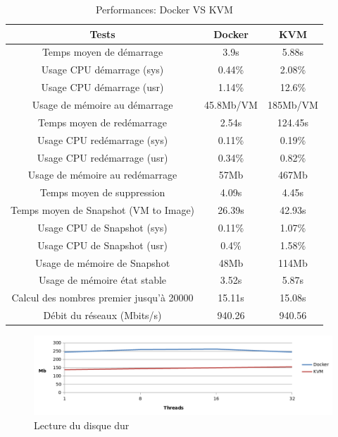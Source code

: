 \begin{onehalfspace}
{\begin{center}
\begin{table}[H]
	\caption{Performances: Docker VS KVM \label{tab:table_label}}
	\begin{tabular}{| c | c | c |} 

	\hline
	\rowcolor{tabHead}
	\textbf{Tests} & \textbf{Docker} & \textbf{KVM}\\
	\hline\hline
	Temps moyen de démarrage 					& 3.9s 				& 	5.88s \\ 
	Usage CPU démarrage (sys)					& 0.44\%			& 	2.08\% \\ 
	Usage CPU démarrage (usr)					& 1.14\% 			& 	12.6\% \\ 
	Usage de mémoire au démarrage				& 45.8Mb/VM 		& 	185Mb/VM \\ 

	Temps moyen de redémarrage 					& 2.54s 			& 	124.45s \\ 
	Usage CPU redémarrage (sys)					& 0.11\% 			& 	0.19\% \\ 
	Usage CPU redémarrage (usr)					& 0.34\% 			& 	0.82\% \\ 
	Usage de mémoire au redémarrage				& 57Mb	 			& 	467Mb	  \\ 

	Temps moyen de suppression 					& 4.09s 			& 	4.45s \\ 

	Temps moyen de Snapshot (VM to Image) 		& 26.39s 			& 	42.93s \\ 
	Usage CPU de Snapshot (sys)			 		& 0.11\% 			& 	1.07\% \\ 
	Usage CPU de Snapshot (usr)			 		& 0.4\% 			& 	1.58\% \\ 
	Usage de mémoire de Snapshot		 		& 48Mb 				& 	114Mb \\ 

	Usage de mémoire état stable				& 3.52s 			& 	5.87s \\ 

	Calcul des nombres premier jusqu'à 20000	& 15.11s 			& 	15.08s \\ 

	Débit du réseaux (Mbits/s)					& 940.26 			& 	940.56 \\ 
	\hline
	\end{tabular}
\end{table}
\end{center}
}


\begin{figure}[H]
\centering
\includegraphics [width=160mm]{chapitre2/assets/file-io-read.png}
\caption{Lecture du disque dur}
\label{fig:}
\end{figure}


\end{onehalfspace}
